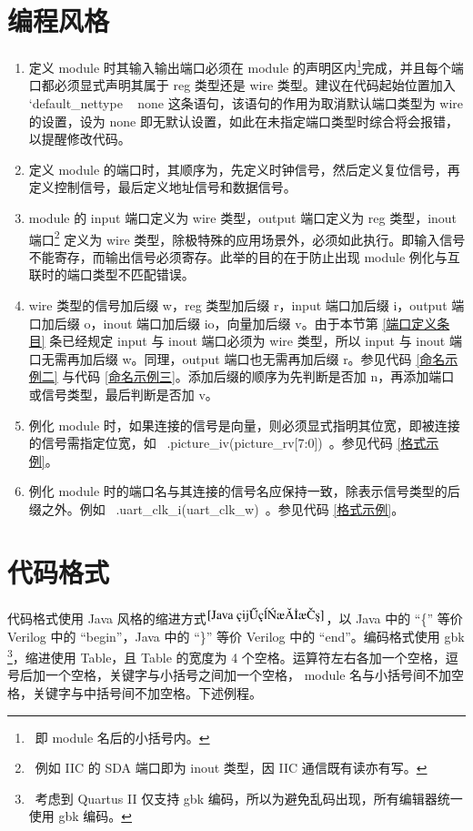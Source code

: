 \documentclass[utf-8, 10pt, a4paper, titlepage, oneside, onecolumn, openany]{ctexart} %
\begin{document}
	\section{编程风格}
		\begin{enumerate}
			\item 定义 module 时其输入输出端口必须在 module 的声明区内\footnote{~即 module 名后的小括号内。}完成，并且每个端口都必须显式声明其属于 reg 类型还是 wire 类型。建议在代码起始位置加入 {`}default\_nettype ~ none 这条语句，该语句的作用为取消默认端口类型为 wire 的设置，设为 none 即无默认设置，如此在未指定端口类型时综合将会报错，以提醒修改代码。
			
			\item 定义 module 的端口时，其顺序为，先定义时钟信号，然后定义复位信号，再定义控制信号，最后定义地址信号和数据信号。
			
			\item module 的 input 端口定义为 wire 类型，output 端口定义为 reg 类型，inout 端口\footnote{~例如 IIC 的 SDA 端口即为 inout 类型，因 IIC 通信既有读亦有写。} 定义为 wire 类型，除极特殊的应用场景外，必须如此执行。即输入信号不能寄存，而输出信号必须寄存。此举的目的在于防止出现 module 例化与互联时的端口类型不匹配错误。 \label{端口定义条目}
			
			\item wire 类型的信号加后缀 w，reg 类型加后缀 r，input 端口加后缀 i，output 端口加后缀 o，inout 端口加后缀 io，向量加后缀 v。由于本节第 \ref{端口定义条目} 条已经规定 input 与 inout 端口必须为 wire 类型，所以 input 与 inout 端口无需再加后缀 w。同理，output 端口也无需再加后缀 r。参见代码 \ref{命名示例二} 与代码 \ref{命名示例三}。添加后缀的顺序为先判断是否加 n，再添加端口或信号类型，最后判断是否加 v。
			
			\item 例化 module 时，如果连接的信号是向量，则必须显式指明其位宽，即被连接的信号需指定位宽，如 ~.picture\_iv(picture\_rv[7:0])~。参见代码 \ref{格式示例}。
			
			\item 例化 module 时的端口名与其连接的信号名应保持一致，除表示信号类型的后缀之外。例如 ~.uart\_clk\_i(uart\_clk\_w)~。参见代码 \ref{格式示例}。
			
		\end{enumerate}

	\clearpage

	\section{代码格式}
		代码格式使用 Java 风格的缩进方式$^{\cite{Java 编程思想}}$，以 Java 中的 “\{” 等价 Verilog 中的 “begin”，Java 中的 “\}” 等价 Verilog 中的 “end”。编码格式使用 gbk \footnote{~考虑到 Quartus II 仅支持 gbk 编码，所以为避免乱码出现，所有编辑器统一使用 gbk 编码。}，缩进使用 Table，且 Table 的宽度为 4 个空格。运算符左右各加一个空格，逗号后加一个空格，关键字与小括号之间加一个空格， module 名与小括号间不加空格，关键字与中括号间不加空格。下述例程。
		
\end{document}

